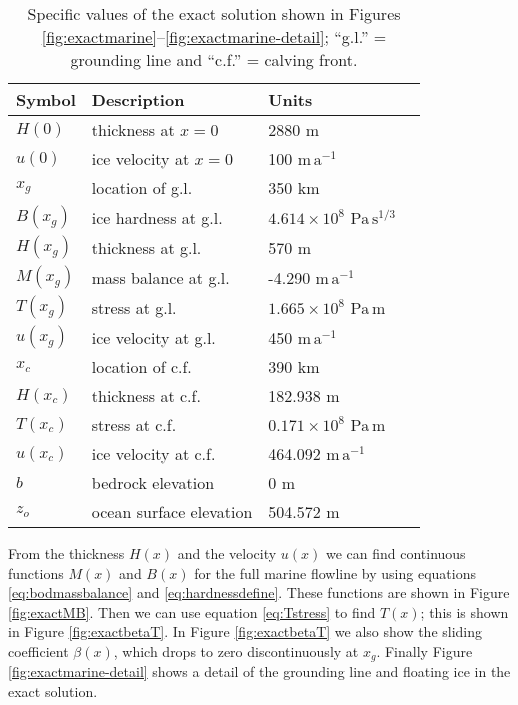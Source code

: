 \documentclass[review,letterpaper]{igs}
\begin{document}
\begin{table}
\caption{Specific values of the exact solution shown in Figures \ref{fig:exactmarine}--\ref{fig:exactmarine-detail}; ``g.l.'' = grounding line and ``c.f.'' = calving front.}\label{tab:exactsoln}

\medskip
\begin{tabular}{llll}
Symbol & Description & Units \\ \hline
$H(0)$ & thickness at $x=0$ & 2880 m  \\
$u(0)$ & ice velocity at $x=0$ & 100 $\text{m}\,\text{a}^{-1}$  \\ \hline
$x_g$ & location of g.l. & 350 km  \\
$B(x_g)$ & ice hardness at g.l. & $4.614 \times 10^{8}$ $\text{Pa}\,\text{s}^{1/3}$  \\
$H(x_g)$ & thickness at g.l. & 570 m  \\
$M(x_g)$ & mass balance at g.l. & -4.290 $\text{m}\,\text{a}^{-1}$  \\
$T(x_g)$ & stress at g.l. & $1.665 \times 10^{8}$ $\text{Pa}\,\text{m}$  \\
$u(x_g)$ & ice velocity at g.l. & 450 $\text{m}\,\text{a}^{-1}$  \\ \hline
$x_c$ & location of c.f. & 390 km  \\
$H(x_c)$ & thickness at c.f. & 182.938 m  \\
$T(x_c)$ & stress at c.f. & $0.171 \times 10^{8}$ $\text{Pa}\,\text{m}$  \\
$u(x_c)$ & ice velocity at c.f. & 464.092 $\text{m}\,\text{a}^{-1}$  \\ \hline
$b$ & bedrock elevation & 0 m \\
$z_o$ & ocean surface elevation & 504.572 m \\
\end{tabular}
\end{table}

From the thickness $H(x)$ and the velocity $u(x)$ we can find continuous functions $M(x)$ and $B(x)$ for the full marine flowline by using equations \eqref{eq:bodmassbalance} and \eqref{eq:hardnessdefine}.  These functions are shown in Figure \ref{fig:exactMB}.  Then we can use equation \eqref{eq:Tstress} to find $T(x)$; this is shown in Figure \ref{fig:exactbetaT}.  In Figure \ref{fig:exactbetaT} we also show the sliding coefficient $\beta(x)$, which drops to zero discontinuously at $x_g$.  Finally Figure \ref{fig:exactmarine-detail} shows a detail of the grounding line and floating ice in the exact solution.
\end{document}
